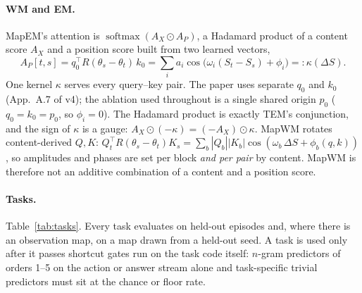 \documentclass[10pt]{article}
\DeclareMathOperator{\softmax}{softmax}
\begin{document}
\paragraph{WM and EM.} MapEM's attention is $\softmax(A_X\odot A_P)$, a Hadamard product of a content score
$A_X$ and a position score built from two learned vectors,
\begin{equation}
A_P[t,s] = q_0^\top R(\theta_s-\theta_t)\, k_0 = \sum_i a_i \cos\!\big(\omega_i (S_t-S_s) + \phi_i\big) =: \kappa(\Delta S).
\label{eq:kernel}
\end{equation}
One kernel $\kappa$ serves every query--key pair. The paper uses separate $q_0$ and $k_0$ (App.~A.7 of v4); the
ablation used throughout is a single shared origin $p_0$ ($q_0=k_0=p_0$, so $\phi_i=0$). The Hadamard product is
exactly TEM's conjunction, and the sign of $\kappa$ is a gauge: $A_X\odot(-\kappa) = (-A_X)\odot\kappa$. MapWM
rotates content-derived $Q,K$: $Q_t^\top R(\theta_s-\theta_t)K_s = \sum_b |Q_b||K_b|\cos(\omega_b\,\Delta S +
\phi_b(q,k))$, so amplitudes and phases are set per block \emph{and per pair} by content. MapWM is therefore not
an additive combination of a content and a position score.

\paragraph{Tasks.} Table~\ref{tab:tasks}. Every task evaluates on held-out episodes and, where there is an
observation map, on a map drawn from a held-out seed. A task is used only after it passes shortcut gates run on the task code
itself: $n$-gram predictors of orders 1--5 on the action or answer stream alone and task-specific trivial predictors
must sit at the chance or floor rate.
\end{document}
